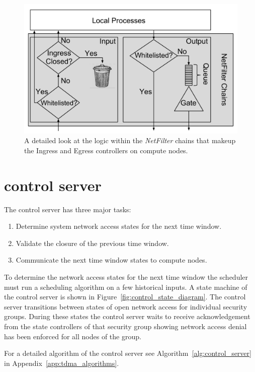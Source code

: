 \documentclass[oneside,12pt]{memoir}
\begin{document}
\begin{figure}
\centering
\includegraphics[scale=0.57]{netfilter_in_out_chains.pdf}
\caption{A detailed look at the logic within the \textit{NetFilter} chains that makeup the Ingress and Egress controllers on compute nodes.}
\label{fig:netfilter_in_out_chains}
\end{figure}

\section{control server}
The control server has three major tasks: 
\begin{enumerate}
\item Determine system network access states for the next time window.
\item Validate the closure of the previous time window.
\item Communicate the next time window states to compute nodes.
\end{enumerate}

To determine the network access states for the next time window the scheduler must run a scheduling algorithm on a few historical inputs. A state machine of the control server is shown in Figure~\ref{fig:control_state_diagram}. The control server transitions between states of open network access for individual security groups. During these states the control server waits to receive acknowledgement from the state controllers of that security group showing network access denial has been enforced for all nodes of the group. 

For a detailed algorithm of the control server see Algorithm~\ref{alg:control_server} in Appendix~\ref{app:tdma_algorithms}.
\end{document}
